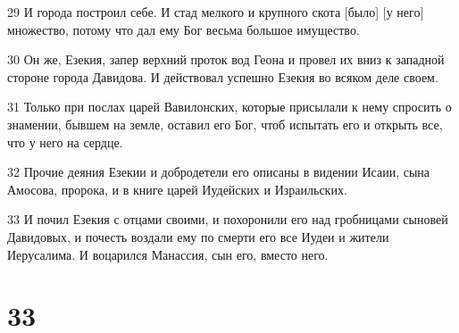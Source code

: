 \par 29 И города построил себе. И стад мелкого и крупного скота [было] [у него] множество, потому что дал ему Бог весьма большое имущество.
\par 30 Он же, Езекия, запер верхний проток вод Геона и провел их вниз к западной стороне города Давидова. И действовал успешно Езекия во всяком деле своем.
\par 31 Только при послах царей Вавилонских, которые присылали к нему спросить о знамении, бывшем на земле, оставил его Бог, чтоб испытать его и открыть все, что у него на сердце.
\par 32 Прочие деяния Езекии и добродетели его описаны в видении Исаии, сына Амосова, пророка, и в книге царей Иудейских и Израильских.
\par 33 И почил Езекия с отцами своими, и похоронили его над гробницами сыновей Давидовых, и почесть воздали ему по смерти его все Иудеи и жители Иерусалима. И воцарился Манассия, сын его, вместо него.

\chapter{33}

